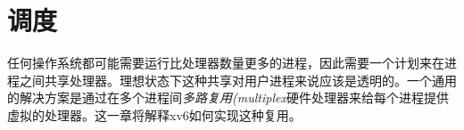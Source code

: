 \chapter{调度}\label{ch07}

任何操作系统都可能需要运行比处理器数量更多的进程，因此需要一个计划来在进程之间共享处理器。理想状态下这种共享对用户进程来说应该是透明的。一个通用的解决方案是通过在多个进程间\emph{多路复用(multiplex}硬件处理器来给每个进程提供虚拟的处理器。这一章将解释xv6如何实现这种复用。

